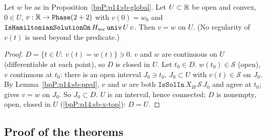 \begin{proposition}[Uniqueness]\label{bpP:p14:sb-unique}
Let $w$ be as in Proposition~\ref{bpP:p14:sb-global}. Let $U\subset\mathbb{R}$ be open and convex, $0\in U$, $v:\mathbb{R}\to\texttt{Phase}(2+2)$ with $v(0)=w_0$ and $\texttt{IsHamiltonianSolutionOn}\,H_{\rm sec}\,\texttt{univ}\,U\,v$. Then $v=w$ on $U$. (No regularity of $v(t)$ is used beyond the predicate.)
\end{proposition}
\begin{proof}
\label{stepP:p14:sb-un-1} $D=\{t\in U:\ v(t)=w(t)\}\ni0$. $v$ and $w$ are continuous on $U$ (differentiable at each point), so $D$ is closed in $U$.
\label{stepP:p14:sb-un-2} Let $t_0\in D$. $w(t_0)\in\mathcal S$ (open), $v$ continuous at $t_0$: there is an open interval $J_0\ni t_0$, $J_0\subset U$ with $v(t)\in\mathcal S$ on $J_0$. By Lemma~\ref{bpP:p14:sb-pred}, $v$ and $w$ are both $\texttt{IsSolIn}\,X_H\,\mathcal S\,J_0$ and agree at $t_0$;  gives $v=w$ on $J_0$. So $J_0\subset D$.
\label{stepP:p14:sb-un-3} $U$ is an interval, hence connected; $D$ is nonempty, open, closed in $U$ (\ref{bpP:p14:sb-x-top}): $D=U$.
\end{proof}

\subsection{Proof of the theorems}\label{bpP:p14:sb-proof}

